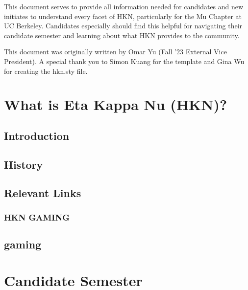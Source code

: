 \documentclass[11pt, article, oneside]{memoir}
\begin{document}
	\maketitle
	
	This document serves to provide all information needed for candidates and new initiates to understand every facet of HKN, particularly for the Mu Chapter at UC Berkeley. Candidates especially should find this helpful for navigating their candidate semester and learning about what HKN provides to the community. 
    \bigbreak

    This document was originally written by Omar Yu (Fall '23 External Vice President). A special thank you to Simon Kuang for the template and Gina Wu for creating the hkn.sty file.
    
	
	\tableofcontents*
	\newpage

    
	\chapter{What is Eta Kappa Nu (HKN)?}
    \section{Introduction}
    \section{History}
    \section{}
    \section{Relevant Links}


    \subsection{HKN GAMING}

    \section{gaming}

    \newpage
    \chapter{Candidate Semester}
\end{document}
